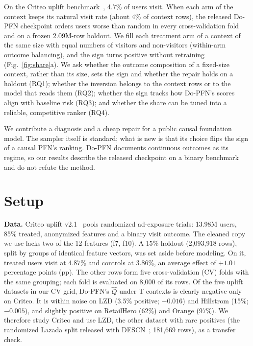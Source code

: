 \documentclass[sigconf,anonymous,review]{acmart}
\DeclareRobustCommand{\dopfn}{\mbox{Do-PFN}\xspace}
\newcommand{\Qhat}{\ensuremath{\hat Q}\xspace}
\begin{document}
On the Criteo uplift benchmark~\cite{diemert2021criteo}, 4.7\% of users visit. When each arm of the context keeps its natural visit rate (about 4\% of context rows), the released \dopfn checkpoint orders users worse than random in every cross-validation fold and on a frozen 2.09M-row holdout. We fill each treatment arm of a context of the same size with equal numbers of visitors and non-visitors (within-arm outcome balancing), and the sign turns positive without retraining (Fig.~\ref{fig:share}a). We ask whether the outcome composition of a fixed-size context, rather than its size, sets the sign and whether the repair holds on a holdout (RQ1); whether the inversion belongs to the context rows or to the model that reads them (RQ2); whether the sign tracks how \dopfn's scores align with baseline risk (RQ3); and whether the share can be tuned into a reliable, competitive ranker (RQ4).

We contribute a diagnosis and a cheap repair for a public causal foundation model. The sampler itself is standard; what is new is that its choice flips the sign of a causal PFN's ranking. \dopfn documents continuous outcomes as its regime, so our results describe the released checkpoint on a binary benchmark and do not refute the method.

\section{Setup}

\textbf{Data.} Criteo uplift v2.1~\cite{diemert2021criteo} pools randomized ad-exposure trials: 13.98M users, 85\% treated, anonymized features and a binary visit outcome. The cleaned copy we use lacks two of the 12 features (f7, f10). A 15\% holdout (2,093,918 rows), split by groups of identical feature vectors, was set aside before modeling. On it, treated users visit at 4.87\% and controls at 3.86\%, an average effect of $+1.01$ percentage points (pp). The other rows form five cross-validation (CV) folds with the same grouping; each fold is evaluated on 8,000 of its rows. Of the five uplift datasets in our CV grid, \dopfn's \Qhat under T contexts is clearly negative only on Criteo. It is within noise on LZD (3.5\% positive; $-0.016$) and Hillstrom (15\%; $-0.005$), and slightly positive on RetailHero (62\%) and Orange (97\%). We therefore study Criteo and use LZD, the other dataset with rare positives (the randomized Lazada split released with \mbox{DESCN}~\cite{zhong2022descn}; 181,669 rows), as a transfer check.
\end{document}
